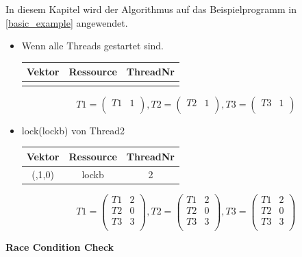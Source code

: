 \documentclass[10pt,a4paper]{article}
\begin{document}
\begin{flushleft}
In diesem Kapitel wird der Algorithmus auf das Beispielprogramm  in \autoref{basic_example} angewendet.\\
\begin{itemize}
\item Wenn alle Threads gestartet sind.\\[0.3cm]
\begin{tabular}{ c c c }
  	Vektor & Ressource & ThreadNr \\\hline
  	  &   &   \\\hline
\end{tabular}
\[
	T1 = \begin{pmatrix}
		T1 & 1\\
	\end{pmatrix}
	, T2 = \begin{pmatrix}
		T2 & 1\\
	\end{pmatrix}
	, T3 = \begin{pmatrix}
		T3 & 1\\
	\end{pmatrix}
\]
\item lock(lockb) von Thread2\\[0.3cm]
\begin{tabular}{ c c c }
  	Vektor & Ressource & ThreadNr \\\hline
  	(,1,0) & lockb & 2 \\\hline
\end{tabular}
\[
	T1 = \begin{pmatrix}
		T1 & 2\\
		T2 & 0\\
		T3 & 3\\
	\end{pmatrix}
	, T2 = \begin{pmatrix}
		T1 & 2\\
		T2 & 0\\
		T3 & 3\\
	\end{pmatrix}
	, T3 = \begin{pmatrix}
		T1 & 2\\
		T2 & 0\\
		T3 & 3\\
	\end{pmatrix}
\]
\end{itemize}
\end{flushleft}

\textbf{Race Condition Check}
\begin{flushleft}

\end{flushleft}
\end{document}
